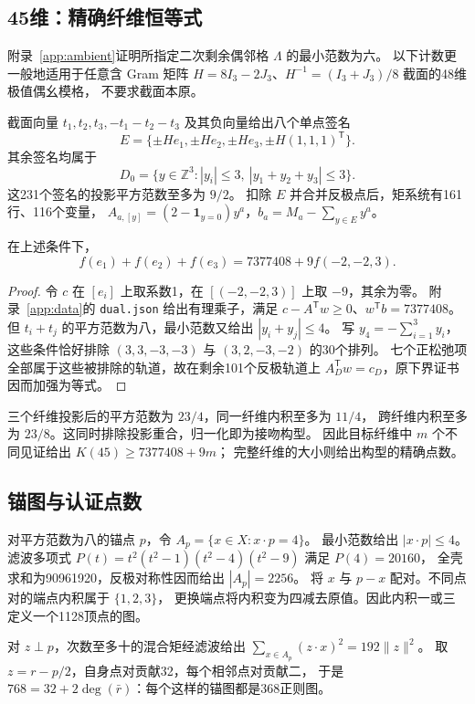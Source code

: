 \subsection{45维：精确纤维恒等式}
附录~\ref{app:ambient}证明所指定二次剩余偶邻格 $\Lambda$ 的最小范数为六。
以下计数更一般地适用于任意含 Gram 矩阵
$H=8I_3-2J_3$、$H^{-1}=(I_3+J_3)/8$ 截面的48维极值偶幺模格，
不要求截面本原。

截面向量 $t_1,t_2,t_3,-t_1-t_2-t_3$ 及其负向量给出八个单点签名
\[
E=\{\pm He_1,\pm He_2,\pm He_3,\pm H(1,1,1)^{\mathsf T}\}.
\]
其余签名均属于
\begin{equation}\label{eq:domain45}
D_0=\{y\in\mathbb Z^3:|y_i|\le3,\ |y_1+y_2+y_3|\le3\}.
\end{equation}
这231个签名的投影平方范数至多为 $9/2$。
扣除 $E$ 并合并反极点后，矩系统有161行、116个变量，
$A_{a,[y]}=(2-\mathbf1_{y=0})y^a$，$b_a=M_a-\sum_{y\in E}y^a$。

\begin{proposition}[精确纤维恒等式]\label{prop:moment45}
在上述条件下，
\[
f(e_1)+f(e_2)+f(e_3)=7377408+9f(-2,-2,3).
\]
\end{proposition}
\begin{proof}
令 $c$ 在 $[e_i]$ 上取系数1，在 $[(-2,-2,3)]$ 上取 $-9$，其余为零。
附录~\ref{app:data}的 \texttt{dual.json} 给出有理乘子，满足
$c-A^{\mathsf T}w\ge0$、$w^{\mathsf T}b=7377408$。
但 $t_i+t_j$ 的平方范数为八，最小范数又给出 $|y_i+y_j|\le4$。
写 $y_4=-\sum_{i=1}^3y_i$，这些条件恰好排除
$(3,3,-3,-3)$ 与 $(3,2,-3,-2)$ 的30个排列。
七个正松弛项全部属于这些被排除的轨道，故在剩余101个反极轨道上
$A_D^{\mathsf T}w=c_D$，原下界证书因而加强为等式。
\end{proof}

三个纤维投影后的平方范数为 $23/4$，同一纤维内积至多为 $11/4$，
跨纤维内积至多为 $23/8$。这同时排除投影重合，归一化即为接吻构型。
因此目标纤维中 $m$ 个不同见证给出 $K(45)\ge7377408+9m$；
完整纤维的大小则给出构型的精确点数。

\subsection{锚图与认证点数}
对平方范数为八的锚点 $p$，令 $A_p=\{x\in X:x\cdot p=4\}$。
最小范数给出 $|x\cdot p|\le4$。滤波多项式
$P(t)=t^2(t^2-1)(t^2-4)(t^2-9)$ 满足 $P(4)=20160$，
全壳求和为90961920，反极对称性因而给出 $|A_p|=2256$。
将 $x$ 与 $p-x$ 配对。不同点对的端点内积属于 $\{1,2,3\}$，
更换端点将内积变为四减去原值。因此内积一或三定义一个1128顶点的图。

对 $z\perp p$，次数至多十的混合矩经滤波给出
$\sum_{x\in A_p}(z\cdot x)^2=192\|z\|^2$。
取 $z=r-p/2$，自身点对贡献32，每个相邻点对贡献二，
于是 $768=32+2\deg(\bar r)$：每个这样的锚图都是368正则图。

